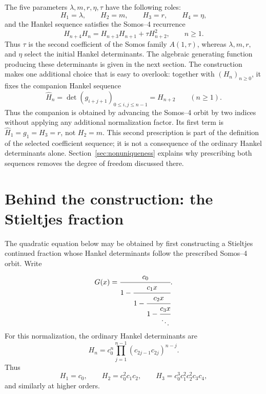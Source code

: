 \documentclass[11pt]{article}
\theoremstyle{remark}
\begin{document}
The five parameters $\lambda,m,r,\eta,\tau$ have the following roles:
\begin{equation}
 H_1=\lambda,\qquad H_2=m,\qquad H_3=r,\qquad H_4=\eta,
 \label{eq:initial-Hankel}
\end{equation}
and the Hankel sequence satisfies the Somos--4 recurrence
\begin{equation}
 H_{n+4}H_n=H_{n+3}H_{n+1}+\tau H_{n+2}^2,\qquad n\geq1.
 \label{eq:Somos}
\end{equation}
Thus $\tau$ is the second coefficient of the Somos family $A(1,\tau)$,
whereas $\lambda,m,r,$ and $\eta$ select the initial Hankel determinants.
The algebraic generating function producing these determinants is given in
the next section.  The construction makes one additional choice that is easy
to overlook: together with $(H_n)_{n\geq0}$, it fixes the companion
Hankel sequence
\begin{equation}
 \widehat H_n=\det(g_{i+j+1})_{0\leq i,j\leq n-1}
 =H_{n+2}\qquad(n\geq1).
 \label{eq:companion-Hankel-choice}
\end{equation}
Thus the companion is obtained by advancing the Somos--4 orbit by two indices
without applying any additional normalization factor.  Its first term is
$\widehat H_1=g_1=H_3=r$, not $H_2=m$.  This second prescription is part
of the definition of the selected coefficient sequence; it is not a
consequence of the ordinary Hankel determinants alone.  Section~\ref{sec:nonuniqueness} explains why prescribing
both sequences removes the degree of freedom discussed there.

\section{Behind the construction: the Stieltjes fraction}
The quadratic equation below may be obtained by first constructing a
Stieltjes continued fraction whose Hankel determinants follow the prescribed
Somos--4 orbit.  Write
\begin{equation}
 G(x)=\cfrac{c_0}{1-\cfrac{c_1x}{1-\cfrac{c_2x}{1-\cfrac{c_3x}{\ddots}}}}.
 \label{eq:S-fraction}
\end{equation}
For this normalization, the ordinary Hankel determinants are\cite{Wall1948,JonesThron1980,Flajolet1980}
\begin{equation}
 H_n=c_0^n\prod_{j=1}^{n-1}(c_{2j-1}c_{2j})^{n-j}.
 \label{eq:S-fraction-Hankel}
\end{equation}
Thus
\[
 H_1=c_0,\qquad
 H_2=c_0^2c_1c_2,\qquad
 H_3=c_0^3c_1^2c_2^2c_3c_4,
\]
and similarly at higher orders.
\end{document}
